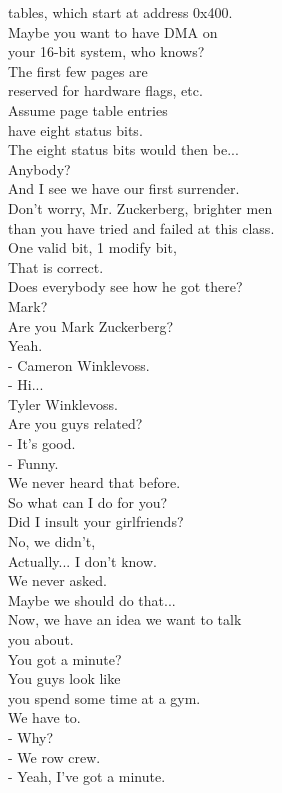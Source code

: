 \documentclass{article}
\begin{document}
\begin{multicols}{3}
tables, which start at address 0x400.\\
Maybe you want to have DMA on\\
your 16-bit system, who knows?\\
The first few pages are\\
reserved for hardware flags, etc.\\
Assume page table entries\\
have eight status bits.\\
The eight status bits would then be...\\
Anybody?\\
And I see we have our first surrender.\\
Don't worry, Mr. Zuckerberg, brighter men\\
than you have tried and failed at this class.\\
One valid bit, 1 modify bit,\\
That is correct.\\
Does everybody see how he got there?\\
Mark?\\
Are you Mark Zuckerberg?\\
Yeah.\\
- Cameron Winklevoss.\\
- Hi...\\
Tyler Winklevoss.\\
Are you guys related?\\
- It's good.\\
- Funny.\\
We never heard that before.\\
So what can I do for you?\\
Did I insult your girlfriends?\\
No, we didn't,\\
Actually... I don't know.\\
We never asked.\\
Maybe we should do that...\\
Now, we have an idea we want to talk\\
you about.\\
You got a minute?\\
You guys look like\\
you spend some time at a gym.\\
We have to.\\
- Why?\\
- We row crew.\\
- Yeah, I've got a minute.\\

\end{multicols}
\end{document}
